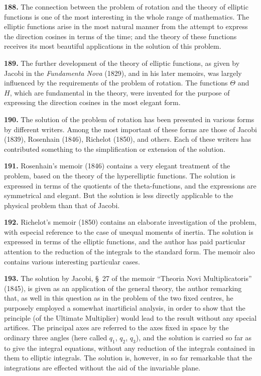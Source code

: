 \documentclass[11pt,a4paper]{book}
\begin{document}
\textbf{188.} The connection between the problem of rotation and the theory of elliptic functions is one of the most interesting in the whole range of mathematics. The elliptic functions arise in the most natural manner from the attempt to express the direction cosines in terms of the time; and the theory of these functions receives its most beautiful applications in the solution of this problem.

\textbf{189.} The further development of the theory of elliptic functions, as given by Jacobi in the \textit{Fundamenta Nova} (1829), and in his later memoirs, was largely influenced by the requirements of the problem of rotation. The functions $\Theta$ and $H$, which are fundamental in the theory, were invented for the purpose of expressing the direction cosines in the most elegant form.

\textbf{190.} The solution of the problem of rotation has been presented in various forms by different writers. Among the most important of these forms are those of Jacobi (1839), Rosenhain (1846), Richelot (1850), and others. Each of these writers has contributed something to the simplification or extension of the solution.

\textbf{191.} Rosenhain's memoir (1846) contains a very elegant treatment of the problem, based on the theory of the hyperelliptic functions. The solution is expressed in terms of the quotients of the theta-functions, and the expressions are symmetrical and elegant. But the solution is less directly applicable to the physical problem than that of Jacobi.

\textbf{192.} Richelot's memoir (1850) contains an elaborate investigation of the problem, with especial reference to the case of unequal moments of inertia. The solution is expressed in terms of the elliptic functions, and the author has paid particular attention to the reduction of the integrals to the standard form. The memoir also contains various interesting particular cases.

\textbf{193.} The solution by Jacobi, \S~27 of the memoir ``Theoria Novi Multiplicatoris'' (1845), is given as an application of the general theory, the author remarking that, as well in this question as in the problem of the two fixed centres, he purposely employed a somewhat inartificial analysis, in order to show that the principle (of the Ultimate Multiplier) would lead to the result without any special artifices. The principal axes are referred to the axes fixed in space by the ordinary three angles (here called $q_1$, $q_2$, $q_3$), and the solution is carried so far as to give the integral equations, without any reduction of the integrals contained in them to elliptic integrals. The solution is, however, in so far remarkable that the integrations are effected without the aid of the invariable plane.
\end{document}
